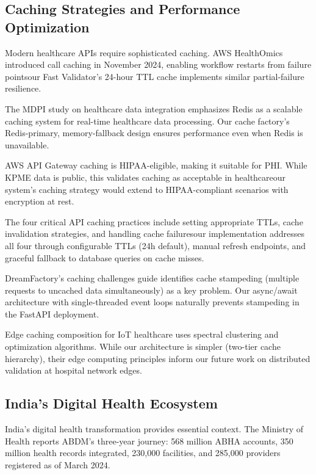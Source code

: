 \documentclass[conference]{IEEEtran}
\begin{document}
\subsection{Caching Strategies and Performance Optimization}

Modern healthcare APIs require sophisticated caching. AWS HealthOmics \cite{aws2024healthomics} introduced call caching in November 2024, enabling workflow restarts from failure pointsour Fast Validator's 24-hour TTL cache implements similar partial-failure resilience.

The MDPI study on healthcare data integration \cite{mdpi2024redis} emphasizes Redis as a scalable caching system for real-time healthcare data processing. Our cache factory's Redis-primary, memory-fallback design ensures performance even when Redis is unavailable.

AWS API Gateway caching \cite{aws2024apigw} is HIPAA-eligible, making it suitable for PHI. While KPME data is public, this validates caching as acceptable in healthcareour system's caching strategy would extend to HIPAA-compliant scenarios with encryption at rest.

The four critical API caching practices \cite{techtarget2024caching} include setting appropriate TTLs, cache invalidation strategies, and handling cache failuresour implementation addresses all four through configurable TTLs (24h default), manual refresh endpoints, and graceful fallback to database queries on cache misses.

DreamFactory's caching challenges guide \cite{dreamfactory2024caching} identifies cache stampeding (multiple requests to uncached data simultaneously) as a key problem. Our async/await architecture with single-threaded event loops naturally prevents stampeding in the FastAPI deployment.

Edge caching composition for IoT healthcare \cite{pmc2023edge} uses spectral clustering and optimization algorithms. While our architecture is simpler (two-tier cache hierarchy), their edge computing principles inform our future work on distributed validation at hospital network edges.

\subsection{India's Digital Health Ecosystem}

India's digital health transformation provides essential context. The Ministry of Health \cite{mohfw2024abdm} reports ABDM's three-year journey: 568 million ABHA accounts, 350 million health records integrated, 230,000 facilities, and 285,000 providers registered as of March 2024.
\end{document}
